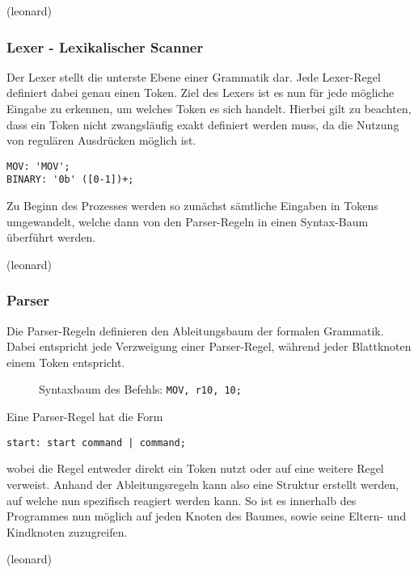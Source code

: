 \documentclass[paper=a4,fontsize=12pt,twocolumn]{scrreprt}
\begin{document}
(leonard)

\subsubsection{Lexer - Lexikalischer Scanner}
Der Lexer stellt die unterste Ebene einer Grammatik dar.
Jede Lexer-Regel definiert dabei genau einen Token.
Ziel des Lexers ist es nun für jede mögliche Eingabe zu erkennen, um welches Token es sich handelt.
Hierbei gilt zu beachten, dass ein Token nicht zwangsläufig exakt definiert werden muss, da die Nutzung von regulären Ausdrücken möglich ist.
\begin{lstlisting}
MOV: 'MOV';
BINARY: '0b' ([0-1])+;
\end{lstlisting}
Zu Beginn des Prozesses werden so zunächst sämtliche Eingaben in Tokens umgewandelt, welche dann von den Parser-Regeln in einen Syntax-Baum überführt werden.

(leonard)

\subsubsection{Parser}
Die Parser-Regeln definieren den Ableitungsbaum der formalen Grammatik.
Dabei entspricht jede Verzweigung einer Parser-Regel, während jeder Blattknoten einem Token entspricht.

\begin{figure}[h]
\centering
\caption{Syntaxbaum des Befehls: \texttt{MOV, r10, 10;}}
\end{figure}

Eine Parser-Regel hat die Form
\begin{lstlisting}
start: start command | command;
\end{lstlisting}
wobei die Regel entweder direkt ein Token nutzt oder auf eine weitere Regel verweist.
Anhand der Ableitungsregeln kann also eine Struktur erstellt werden, auf welche nun spezifisch reagiert werden kann.
So ist es innerhalb des Programmes nun möglich auf jeden Knoten des Baumes, sowie seine Eltern- und Kindknoten zuzugreifen.

(leonard)
\end{document}
